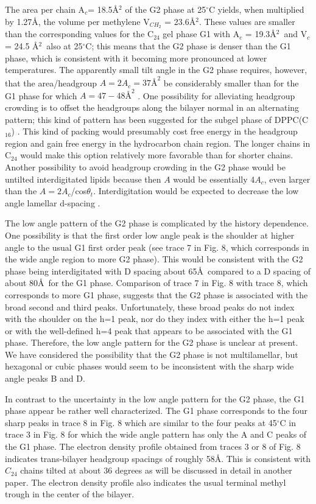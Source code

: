 The area per chain A$_c$= 18.5\AA$^2$ of the G2 phase at
25$^{\circ}$C yields, when multiplied by 1.27\AA, the volume per
methylene V$_{CH_{2}}$ = 23.6\AA$^2$. These values are smaller than the 
corresponding
values for the C$_{24}$ gel phase G1 with A$_c$ = 19.3\AA$^2$\ and V$_c$ = 24.5
\AA$^2$\ also at 25$^{\circ}$C; this means that the G2 phase
is denser than the G1 phase, which is consistent with it becoming more
pronounced at lower temperatures.  The apparently small tilt angle in
the G2 phase requires, however, that the
area/headgroup $A = 2A_c = 37\text{\AA}^2$ be considerably smaller than for the 
G1 phase for which $A = 47-48\text{\AA}^2$ \cite{STN92}.  One possibility for 
alleviating headgroup crowding is to offset the headgroups along the bilayer
normal in an alternating pattern; this kind of pattern has been suggested
for the subgel phase of DPPC(C$_{16}$) \cite{RuoS82A}.  This kind of packing 
would presumably 
cost free energy in the headgroup region and gain free energy in the
hydrocarbon chain region.   The longer chains in C$_{24}$ would make this
option relatively more favorable than for shorter chains.
Another possibility to avoid headgroup crowding in the G2 phase
would be untilted interdigitated lipids because then $A$ would 
be essentially 4$A_c$, even larger than the $A = 2A_c$/cos$\theta_{t}$.  
Interdigitation would be expected to decrease the low angle lamellar 
d-spacing \cite{McI84}.  

The low angle pattern of the G2 phase is complicated by the history
dependence.  One possibility is that the first order low angle peak is the
shoulder at higher angle to the usual G1 first order peak (see trace 7 in
Fig. 8, which corresponds in the wide angle region to more G2 phase).  
This would be consistent with the G2 phase being interdigitated
with D spacing about 65\AA\ compared to a D spacing of about 80\AA\
for the G1 phase.  Comparison of trace 7 in Fig. 8 with trace 8, which
corresponds to more G1 phase, suggests that the G2 phase is associated with the 
broad second and third peaks.  Unfortunately,
these broad peaks do not index with the shoulder on the h=1 peak, nor do
they index with either the h=1 peak or with the well-defined h=4 peak that
appears to be
associated with the G1 phase. Therefore, the low angle pattern for the
G2 phase is unclear at present.  We have considered the possibility that the
G2 phase is not multilamellar, but hexagonal or cubic phases would seem to
be inconsistent with the sharp wide angle peaks B and D.  

In contrast to the uncertainty in the low angle pattern for the G2 phase, the
G1 phase appear be rather well characterized.  The G1 phase
corresponds to the four sharp peaks in trace 8 in
Fig. 8 which are similar to the four peaks at 45$^{\circ}$C in trace 3 in 
Fig. 8 for which the wide angle pattern has only the A and C peaks of the
G1 phase.  The electron density profile obtained from traces 3 or 8
of Fig. 8 indicates trans-bilayer headgroup spacings of roughly
58\AA.  This is consistent with $C_{24}$ chains tilted at about 36 degrees
as will be discussed in detail in another paper.
The electron density profile also indicates the usual terminal methyl trough 
in the center of the bilayer.

